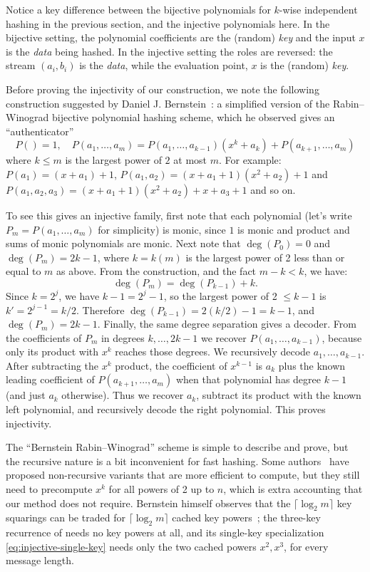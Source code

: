 Notice a key difference between the bijective polynomials for $k$-wise independent hashing in the previous section, and the injective polynomials here.
In the bijective setting, the polynomial coefficients are the (random) \emph{key} and the input $x$ is the \emph{data} being hashed.
In the injective setting the roles are reversed: the stream $(a_i,b_i)$ is the \emph{data}, while the evaluation point, $x$ is the (random) \emph{key}.

\vspace{.5em}

Before proving the injectivity of our construction, we note the following construction
suggested by Daniel J. Bernstein~\cite{Bernstein:2011:RW}: a simplified version of the
Rabin--Winograd bijective polynomial hashing scheme, which he observed gives an ``authenticator''
\[
   P() = 1, \quad
   P(a_1, \ldots, a_m) = P(a_1, \ldots, a_{k-1})(x^k + a_k) + P(a_{k+1}, \ldots, a_m)
\]
where $k \le m$ is the largest power of $2$ at most $m$.
For example:
$P(a_1)=(x+a_1)+1$,
$P(a_1,a_2) = (x+a_1+1)(x^2+a_2)+1$
and $P(a_1,a_2,a_3) = (x+a_1+1)(x^2+a_2)+x+a_3+1$
and so on.

To see this gives an injective family, first note
that each polynomial (let's write $P_m = P(a_1,\dots,a_m)$ for simplicity)
is monic, since $1$ is monic and product and sums of monic polynomials are monic.
%
Next note that $\deg(P_0)=0$ and $\deg(P_m) = 2k-1$, where $k=k(m)$ is the largest power of 2 less than or equal to $m$ as above.
From the construction, and the fact $m-k<k$, we have:
\[
   \deg(P_m) = \deg(P_{k-1}) + k.
\]
Since $k = 2^j$, we have $k - 1 = 2^j - 1$, so the largest power of 2 $\le k-1$ is $k' = 2^{j-1} = k/2$.
Therefore $\deg(P_{k-1}) = 2(k/2) - 1 = k - 1$,
and $\deg(P_m) = 2k-1$.
%
Finally, the same degree separation gives a decoder.  From the coefficients of
$P_m$ in degrees $k,\ldots,2k-1$ we recover $P(a_1,\ldots,a_{k-1})$, because
only its product with $x^k$ reaches those degrees.  We recursively decode
$a_1,\ldots,a_{k-1}$.  After subtracting the $x^k$ product, the coefficient of
$x^{k-1}$ is $a_k$ plus the known leading coefficient of
$P(a_{k+1},\ldots,a_m)$ when that polynomial has degree $k-1$ (and just
$a_k$ otherwise).  Thus we recover $a_k$, subtract its product with the known
left polynomial, and recursively decode the right polynomial.  This proves
injectivity.

The ``Bernstein Rabin--Winograd'' scheme is simple to describe and prove, but
the recursive nature is a bit inconvenient for fast hashing.
Some authors~\cite{chakrabortyefficient} have proposed non-recursive variants that are more efficient to compute, but they still need to precompute $x^k$ for all powers of 2 up to $n$, which is extra accounting that our method does not require.
Bernstein himself observes that the $\lceil\log_2 m\rceil$ key squarings can be traded for $\lceil\log_2 m\rceil$ cached key powers~\cite[\S5.8]{Bernstein:2011:RW}; the three-key recurrence of  needs no key powers at all, and its single-key specialization \eqref{eq:injective-single-key} needs only the two cached powers $x^2,x^3$, for every message length.

